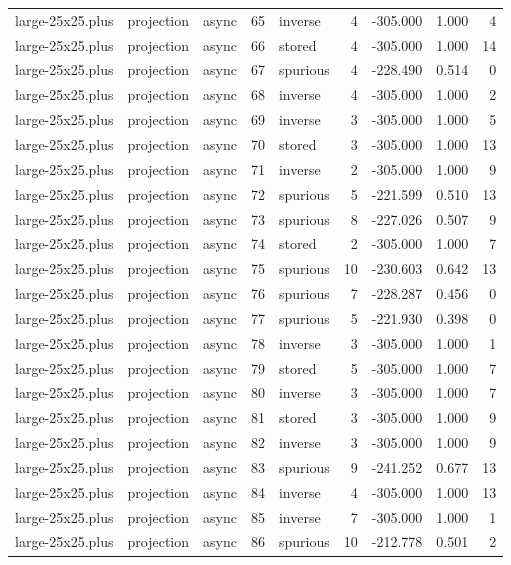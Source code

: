 \begin{tabular}{lllrlrrrr}
large-25x25.plus & projection & async & 65 & inverse & 4 & -305.000 & 1.000 & 4 \\
large-25x25.plus & projection & async & 66 & stored & 4 & -305.000 & 1.000 & 14 \\
large-25x25.plus & projection & async & 67 & spurious & 4 & -228.490 & 0.514 & 0 \\
large-25x25.plus & projection & async & 68 & inverse & 4 & -305.000 & 1.000 & 2 \\
large-25x25.plus & projection & async & 69 & inverse & 3 & -305.000 & 1.000 & 5 \\
large-25x25.plus & projection & async & 70 & stored & 3 & -305.000 & 1.000 & 13 \\
large-25x25.plus & projection & async & 71 & inverse & 2 & -305.000 & 1.000 & 9 \\
large-25x25.plus & projection & async & 72 & spurious & 5 & -221.599 & 0.510 & 13 \\
large-25x25.plus & projection & async & 73 & spurious & 8 & -227.026 & 0.507 & 9 \\
large-25x25.plus & projection & async & 74 & stored & 2 & -305.000 & 1.000 & 7 \\
large-25x25.plus & projection & async & 75 & spurious & 10 & -230.603 & 0.642 & 13 \\
large-25x25.plus & projection & async & 76 & spurious & 7 & -228.287 & 0.456 & 0 \\
large-25x25.plus & projection & async & 77 & spurious & 5 & -221.930 & 0.398 & 0 \\
large-25x25.plus & projection & async & 78 & inverse & 3 & -305.000 & 1.000 & 1 \\
large-25x25.plus & projection & async & 79 & stored & 5 & -305.000 & 1.000 & 7 \\
large-25x25.plus & projection & async & 80 & inverse & 3 & -305.000 & 1.000 & 7 \\
large-25x25.plus & projection & async & 81 & stored & 3 & -305.000 & 1.000 & 9 \\
large-25x25.plus & projection & async & 82 & inverse & 3 & -305.000 & 1.000 & 9 \\
large-25x25.plus & projection & async & 83 & spurious & 9 & -241.252 & 0.677 & 13 \\
large-25x25.plus & projection & async & 84 & inverse & 4 & -305.000 & 1.000 & 13 \\
large-25x25.plus & projection & async & 85 & inverse & 7 & -305.000 & 1.000 & 1 \\
large-25x25.plus & projection & async & 86 & spurious & 10 & -212.778 & 0.501 & 2 \\

\end{tabular}
